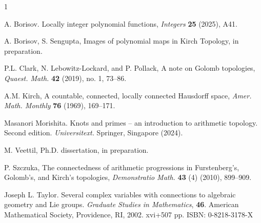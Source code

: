 \documentclass[10pt]{article}
\theoremstyle{definition}
\begin{document}
\begin{thebibliography}{1} \footnotesize

 A. Borisov. Locally integer polynomial functions, {\it Integers} {\bf 25} (2025), A41.

 A. Borisov, S. Sengupta, Images of polynomial maps in Kirch Topology, in preparation.

 P.L. Clark, N. Lebowitz-Lockard, and P. Pollack, A note on Golomb topologies, {\it Quaest. Math.} {\bf 42} (2019), no. 1, 73--86.

 A.M. Kirch, A countable, connected, locally connected Hausdorff space,
{\it Amer. Math. Monthly} {\bf 76} (1969), 169--171.

 Masanori Morishita. Knots and primes -- an introduction to arithmetic topology. Second edition.  {\it Universitext.} Springer, Singapore (2024).

 M. Veettil, Ph.D. dissertation, in preparation.

 P. Szczuka, The connectedness of arithmetic progressions in Furstenberg’s, Golomb’s, and Kirch’s topologies, {\it Demonstratio Math.} {\bf 43} (4) (2010), 899--909.

 Joseph L. Taylor. Several complex variables with connections to algebraic geometry and Lie groups. {\it Graduate Studies in Mathematics}, {\bf 46}. American Mathematical Society, Providence, RI, 2002. xvi+507 pp. ISBN: 0-8218-3178-X

\end{thebibliography}
\end{document}
